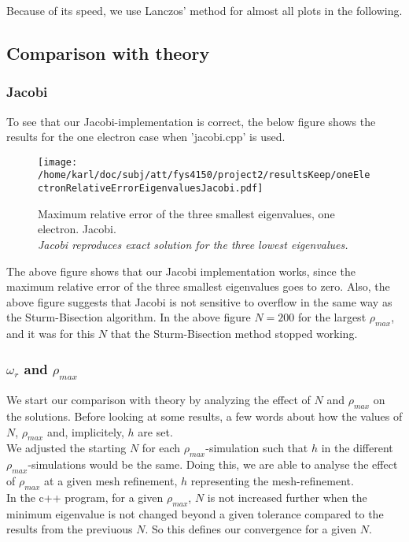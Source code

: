 \documentclass{article}
\begin{document}
Because of its speed, we use Lanczos' method for almost all plots in the following.

\subsection{Comparison with theory}

\subsubsection{Jacobi}

To see that our Jacobi-implementation is correct, the below figure shows the results for the one electron case when 'jacobi.cpp' is used.

\begin{figure}[H]
	\centering
	\texttt{[image: /home/karl/doc/subj/att/fys4150/project2/resultsKeep/oneElectronRelativeErrorEigenvaluesJacobi.pdf]}
	\caption{Maximum relative error of the three smallest eigenvalues, one electron. Jacobi.\\ \textit{Jacobi reproduces exact solution for the three lowest eigenvalues.}}
	\label{1}
\end{figure}

The above figure shows that our Jacobi implementation works, since the maximum relative error of the three smallest eigenvalues goes to zero. Also, the above figure suggests that Jacobi is not sensitive to overflow in the same way as the Sturm-Bisection algorithm. In the above figure $N=200$ for the largest $\rho_{max}$, and it was for this $N$ that the Sturm-Bisection method stopped working.

\subsubsection{$\omega_r$ and $\rho_{max}$}
We start our comparison with theory by analyzing the effect of $N$ and $\rho_{max}$ on the solutions. Before looking at some results, a few words about how the values of $N$, $\rho_{max}$ and, implicitely, $h$ are set.\\

We adjusted the starting $N$ for each $\rho_{max}$-simulation such that $h$ in the different $\rho_{max}$-simulations would be the same. Doing this, we are able to analyse the effect of $\rho_{max}$ at a given mesh refinement, $h$ representing the mesh-refinement.\\

In the c++ program, for a given $\rho_{max}$, $N$ is not increased further when the minimum eigenvalue is not changed beyond a given tolerance compared to the results from the previuous $N$. So this defines our convergence for a given $N$. \\
\end{document}

